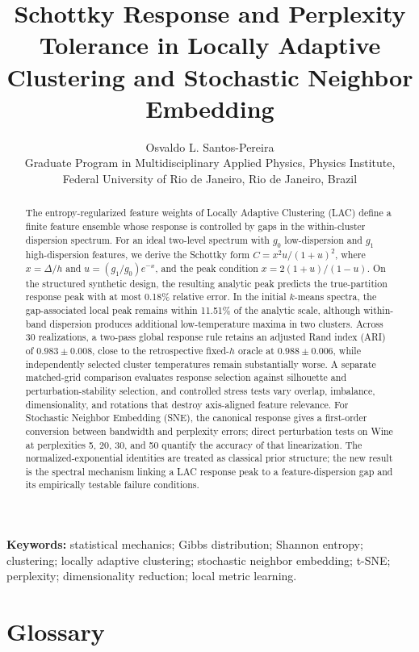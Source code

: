 \documentclass[11pt,a4paper]{article}
\title{\textbf{Schottky Response and Perplexity Tolerance in Locally Adaptive Clustering and Stochastic Neighbor Embedding}}
\author{Osvaldo L. Santos-Pereira\\
\small Graduate Program in Multidisciplinary Applied Physics, Physics Institute,\\
\small Federal University of Rio de Janeiro, Rio de Janeiro, Brazil}
\date{}
\theoremstyle{definition}
\theoremstyle{plain}
\begin{document}
\maketitle

\begin{abstract}
The entropy-regularized feature weights of Locally Adaptive Clustering (LAC) define a finite feature ensemble whose response is controlled by gaps in the within-cluster dispersion spectrum. For an ideal two-level spectrum with $g_0$ low-dispersion and $g_1$ high-dispersion features, we derive the Schottky form $C=x^2u/(1+u)^2$, where $x=\Delta/h$ and $u=(g_1/g_0)e^{-x}$, and the peak condition $x=2(1+u)/(1-u)$. On the structured synthetic design, the resulting analytic peak predicts the true-partition response peak with at most 0.18\% relative error. In the initial $k$-means spectra, the gap-associated local peak remains within 11.51\% of the analytic scale, although within-band dispersion produces additional low-temperature maxima in two clusters. Across 30 realizations, a two-pass global response rule retains an adjusted Rand index (ARI) of $0.983\pm0.008$, close to the retrospective fixed-$h$ oracle at $0.988\pm0.006$, while independently selected cluster temperatures remain substantially worse. A separate matched-grid comparison evaluates response selection against silhouette and perturbation-stability selection, and controlled stress tests vary overlap, imbalance, dimensionality, and rotations that destroy axis-aligned feature relevance. For Stochastic Neighbor Embedding (SNE), the canonical response gives a first-order conversion between bandwidth and perplexity errors; direct perturbation tests on Wine at perplexities 5, 20, 30, and 50 quantify the accuracy of that linearization. The normalized-exponential identities are treated as classical prior structure; the new result is the spectral mechanism linking a LAC response peak to a feature-dispersion gap and its empirically testable failure conditions.
\end{abstract}

\noindent\textbf{Keywords:} statistical mechanics; Gibbs distribution; Shannon entropy; clustering; locally adaptive clustering; stochastic neighbor embedding; t-SNE; perplexity; dimensionality reduction; local metric learning.

\clearpage
\section*{Glossary}
\end{document}
